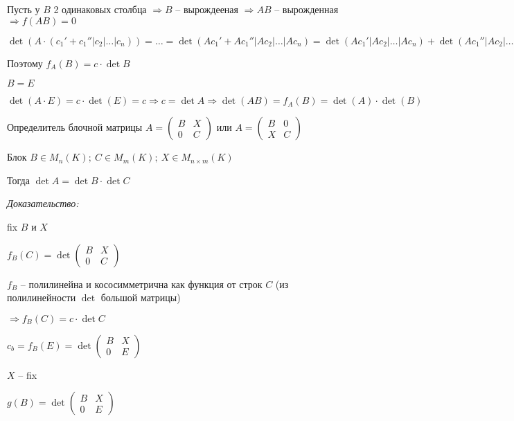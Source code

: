 \documentclass[12pt]{article}
\begin{document}
Пусть у $B$ 2 одинаковых столбца $\Rightarrow B$ -- вырождееная $\Rightarrow AB$ -- вырожденная $\Rightarrow f(AB) = 0$

$\det (A \cdot (c_1' + c_1'' | c_2 | \ldots | c_n)) = \ldots = \det (Ac_1' + Ac_1'' | Ac_2 | \ldots | Ac_n) = \det (Ac_1' | Ac_2 | \ldots | Ac_n) + \det (Ac_1'' | Ac_2 | \ldots | Ac_n) = \det A \cdot \det (c_1' | c_2 | \ldots | c_n) + \det A \cdot \det (c_1'' | c_2 | \ldots | c_n)$

Поэтому $f_A(B) = c \cdot \det B$

$B = E$

$\det (A \cdot E) = c \cdot \det(E) = c \Rightarrow c = \det A \Rightarrow \det (AB) = f_A(B) = \det (A) \cdot \det (B)$

\begin{theo}{Определитель блочной матрицы}
    $A = \begin{pmatrix}
        B & X \\
        0 & C
    \end{pmatrix}$ или $A = \begin{pmatrix}
        B & 0 \\
        X & C
    \end{pmatrix}$

    Блок $B \in M_n(K);\ C \in M_m(K);\ X \in M_{n \times m}(K)$

    Тогда $\det A = \det B \cdot \det C$
\end{theo}

\textit{Доказательство:}

fix $B$ и $X$

$f_B(C) = \det \begin{pmatrix}
    B & X \\
    0 & C
\end{pmatrix}$

$f_B$ -- полилинейна и кососимметрична как функция от строк $C$ (из полилинейности $\det$ большой матрицы)

$\Rightarrow f_B(C) = c \cdot \det C$

$c_b = f_B(E) = \det \begin{pmatrix}
    B & X \\
    0 & E
\end{pmatrix}$

$X$ -- fix 

$g(B) = \det \begin{pmatrix}
    B & X \\
    0 & E
\end{pmatrix}$
\end{document}
